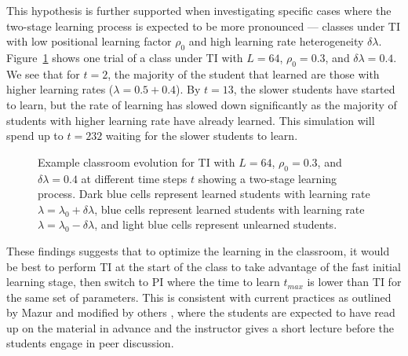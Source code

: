 \documentclass[twocolumn,secnumarabic,amssymb, nobibnotes, aps, prd]{revtex4-2}
\begin{document}
        This hypothesis is further supported when investigating specific cases where the two-stage learning process is expected to be more pronounced --- classes under TI with low positional learning factor $\rho_0$ and high learning rate heterogeneity $\delta\lambda$.
        Figure~\ref{fig:two stage learning} shows one trial of a class under TI with $L=64$, $\rho_0=0.3$, and $\delta\lambda=0.4$.
        We see that for $t=2$, the majority of the student that learned are those with higher learning rates ($\lambda=0.5+0.4$).
        By $t=13$, the slower students have started to learn, but the rate of learning has slowed down significantly as the majority of students with higher learning rate have already learned.
        This simulation will spend up to $t=232$ waiting for the slower students to learn.

    \begin{figure}[htbp!]
        \centering
        \caption{Example classroom evolution for TI with $L=64$, $\rho_0=0.3$, and $\delta\lambda=0.4$ at different time steps $t$ showing a two-stage learning process.
        Dark blue cells represent learned students with learning rate $\lambda=\lambda_0+\delta\lambda$, blue cells represent learned students with learning rate $\lambda=\lambda_0-\delta\lambda$, and light blue cells represent unlearned students.}
        \label{fig:two stage learning}
    \end{figure}

    These findings suggests that to optimize the learning in the classroom, it would be best to perform TI at the start of the class to take advantage of the fast initial learning stage, then switch to PI where the time to learn $t_{max}$ is lower than TI for the same set of parameters.
    This is consistent with current practices as outlined by Mazur \cite{mazur1997peer} and modified by others \cite{smith2009peer,roxas2010seating,lasry2008peer}, where the students are expected to have read up on the material in advance and the instructor gives a short lecture before the students engage in peer discussion.
\end{document}
